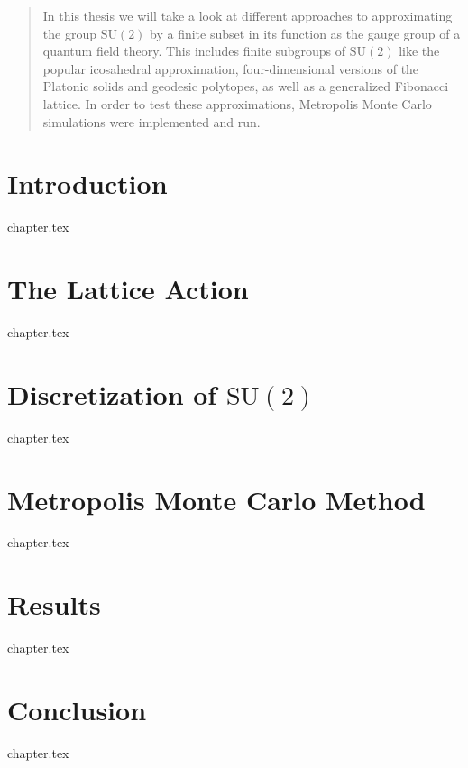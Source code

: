 \documentclass[a4paper,twoside]{scrartcl}
\newcommand{\SUTwo}{$\mathrm{SU}(2)$\xspace}
\begin{document}


\begin{abstract}
 In this thesis we will take a look at different approaches to approximating the group \SUTwo by a finite subset in its function as the gauge group of a quantum field theory. This includes finite subgroups of \SUTwo like the popular icosahedral approximation, four-dimensional versions of the Platonic solids and geodesic polytopes, as well as a generalized Fibonacci lattice. In order to test these approximations, Metropolis Monte Carlo simulations were implemented and run.
\end{abstract}

\tableofcontents
\newpage

\section{Introduction}
{chapter.tex}

\section{The Lattice Action}
{chapter.tex}

\section{Discretization of \SUTwo}
\label{sec:discSu2}
{chapter.tex}

\section{Metropolis Monte Carlo Method}
{chapter.tex}

\section{Results}
\label{sec:results}
{chapter.tex}

\section{Conclusion}
\label{sec:conclusion}
{chapter.tex}

\printbibliography
\end{document}
